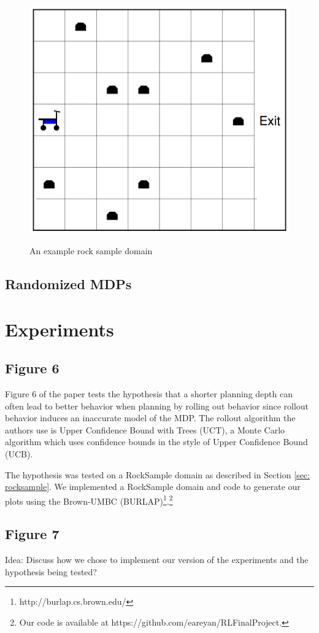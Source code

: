 \documentclass[11pt]{article} %
\begin{document}
\begin{figure}[h]
\label{fig: RockSample}
\centering
\includegraphics[page=1,width=.42\textwidth]{rock_sample_domain.png} \\
\caption{An example rock sample domain}
\end{figure}

\subsection{Randomized MDPs}


\section{Experiments}
\subsection{Figure 6}
Figure 6 of the paper tests the hypothesis that a shorter planning depth can often lead to better behavior when planning by rolling out behavior since rollout behavior induces an inaccurate model of the MDP. The rollout algorithm the authors use is Upper Confidence Bound with Trees (UCT), a Monte Carlo algorithm which uses confidence bounds in the style of Upper Confidence Bound (UCB).

The hypothesis was tested on a RockSample domain as described in Section \ref{sec: rocksample}. We implemented a RockSample domain and code to generate our plots using the Brown-UMBC (BURLAP)\footnote{http://burlap.cs.brown.edu/}.\footnote{Our code is available at https://github.com/eareyan/RLFinalProject.}

\subsection{Figure 7}


Idea: Discuss how we chose to implement our version of the experiments and the hypothesis being tested?
\end{document}
